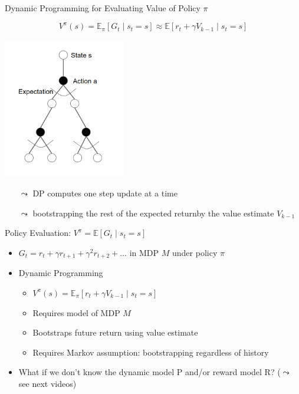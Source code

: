 \begin{frame}[c]{Dynamic Programming for Evaluating Value of Policy $\pi$}

$$V^\pi (s) = \mathbb{E}_\pi [G_t \mid s_t = s] \approx \mathbb{E} [r_t + \gamma V_{k-1} \mid s_t = s]$$

\begin{center}
	\includegraphics[width=0.4\textwidth]{images/state_action_graph2.png}
\end{center}

\vspace{-1cm}
\pause
\begin{itemize}
	\item[$\leadsto$] DP computes one step update at a time
	\item[$\leadsto$] bootstrapping the rest of the expected return\newline by the value estimate $V_{k-1}$
\end{itemize}

\end{frame}
\begin{frame}[c]{Policy Evaluation: $V^\pi = \mathbb{E}[G_t \mid s_t = s]$}

\begin{itemize}
	\item $G_t = r_t + \gamma r_{t+1} + \gamma^2 r_{t+2} + \ldots$ in MDP $M$ under policy $\pi$
	\item Dynamic Programming
	\begin{itemize}
		\item $V^\pi (s)  = \mathbb{E}_\pi [r_t + \gamma V_{k-1} \mid s_t = s]$
		\item \alert{Requires model of MDP $M$}
		\item Bootstraps future return using value estimate
		\item Requires Markov assumption: bootstrapping regardless of history
	\end{itemize}
	\pause
	\medskip
	\item What if we don't know the dynamic model P and/or reward model R? ($\leadsto$ see next videos)
\end{itemize}

\end{frame}

